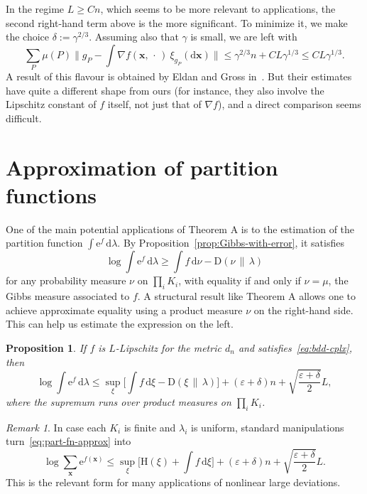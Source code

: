 \documentclass[aop,preprint]{imsart}
\newtheorem{prop}[thm]{Proposition}
\theoremstyle{remark}
\newtheorem*{rmk}{Remark}
\renewcommand{\bf}[1]{\boldsymbol{#1}}
\newcommand{\rmH}{\mathrm{H}}
\renewcommand{\d}{\mathrm{d}}
\newcommand{\rme}{\mathrm{e}}
\newcommand{\eps}{\varepsilon}
\newcommand{\g}{\gamma}
\renewcommand{\l}{\lambda}
\newcommand{\rmD}{\mathrm{D}}
\begin{document}
In the regime $L\geq Cn$, which seems to be more relevant to applications, the second right-hand term above is the more significant.  To minimize it, we make the choice $\delta := \g^{2/3}$.  Assuming also that $\g$ is small, we are left with
	\[\sum_{P}\mu(P)\Big\|g_P - \int \nabla f(\bf{x},\,\cdot\,)\ \xi_{g_P}(\d\bf{x})\Big\| \leq \g^{2/3}n + CL\g^{1/3}  \leq CL\g^{1/3}.\]
A result of this flavour is obtained by Eldan and Gross in~\cite[Theorem 9]{EldGro18}.  But their estimates have quite a different shape from ours (for instance, they also involve the Lipschitz constant of $f$ itself, not just that of $\nabla f$), and a direct comparison seems difficult.


\section{Approximation of partition functions}\label{sec:part-fn-approx}

One of the main potential applications of Theorem A is to the estimation of the partition function $\int \rme^f\,\d\l$.  By Proposition~\ref{prop:Gibbs-with-error}, it satisfies
\begin{equation}\label{eq:Gibbs-again}
\log \int \rme^f\,\d\l \geq \int f\,\d\nu - \rmD(\nu\,\|\,\l)
\end{equation}
for any probability measure $\nu$ on $\prod_i K_i$, with equality if and only if $\nu = \mu$, the Gibbs measure associated to $f$.  A structural result like Theorem A allows one to achieve approximate equality using a product measure $\nu$ on the right-hand side.  This can help us estimate the expression on the left.

\begin{prop}\label{prop:part-fn-approx}
	If $f$ is $L$-Lipschitz for the metric $d_n$ and satisfies~\eqref{eq:bdd-cplx}, then
	\begin{equation}\label{eq:part-fn-approx}
	\log \int \rme^f\,\d\l \leq \sup_\xi\Big[\int f\,\d\xi - \rmD(\xi\,\|\,\l)\Big] + (\eps + \delta)n + \sqrt{\frac{\eps + \delta}{2}}L,
	\end{equation}
where the supremum runs over product measures on $\prod_i K_i$.
	\end{prop}

\begin{rmk}
	In case each $K_i$ is finite and $\l_i$ is uniform, standard manipulations turn~\eqref{eq:part-fn-approx} into
\[\log \sum_{\bf{x}}\rme^{f(\bf{x})} \leq \sup_\xi\Big[\rmH(\xi) + \int f\,\d\xi\Big] + (\eps + \delta)n + \sqrt{\frac{\eps + \delta}{2}}L.\]
This is the relevant form for many applications of nonlinear large deviations.
\end{rmk}
\end{document}
